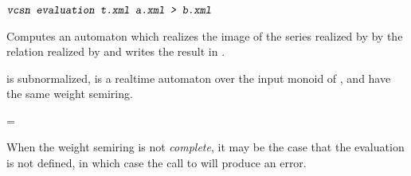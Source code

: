 %


% 
% 
% 


\subsubsection{}
\label{ssc:fmp-eva-ltn}%

\begin{SwClCmd}
\begin{shell}
$ \textsl{\texttt{vcsn evaluation t.xml a.xml > b.xml}}
$
\end{shell}%
\end{SwClCmd}%
\begin{SwClTxt}
    Computes an automaton which realizes the 
    image of the series realized by  by the relation 
    realized by  and writes the result in  
    . 
\end{SwClTxt}%


\Prec {} is subnormalized,  is a realtime 
automaton over the input monoid of  ,  and 
 have the same weight semiring.

\Spec
{} = 

\Comt
When the weight semiring is not \emph{complete}, it may be the case 
that the evaluation is not defined, in which case the call to 
 will produce an error.

